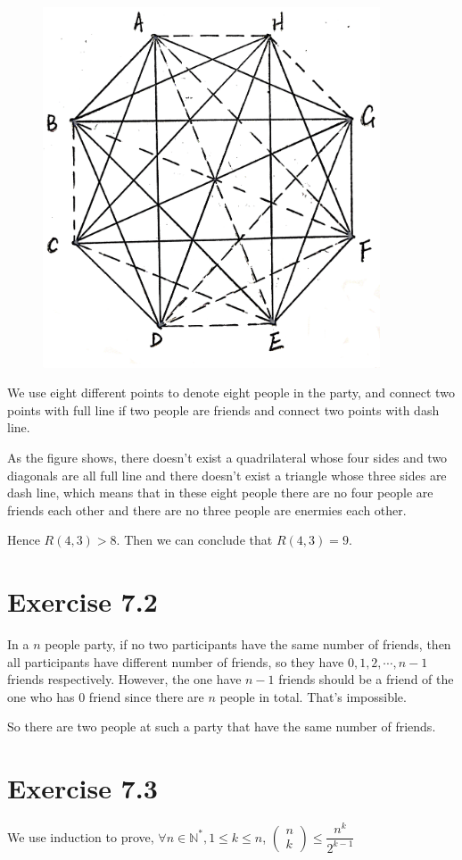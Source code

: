 \documentclass[a4paper,12pt,titlepage]{article}
\begin{document}
\begin{figure}[H]
	\centering
	\includegraphics[width=10cm]{2.jpg}
\end{figure}

We use eight different points to denote eight people in the party, and connect two points with full line if two people are friends and connect two points with dash line.
 
As the figure shows, there doesn't exist a quadrilateral whose four sides and two diagonals are all full line and there doesn't exist a triangle whose three sides are dash line, which means that in these eight people there are no four people are friends each other and there are no three people are enermies each other. 

Hence $R(4,3)>8$. Then we can conclude that $R(4,3)=9$.

\section*{Exercise 7.2}
In a $n$ people party, if no two participants have the same number of friends, then all participants have different number of friends, so they have $0,1,2,\cdots,n-1$ friends respectively. However, the one have $n-1$ friends should be a friend of the one who has $0$ friend since there are $n$ people in total. That's impossible.

So there are two people at such a party that have the same number of friends.

\section*{Exercise 7.3}
We use induction to prove, $\forall n\in\mathbb{N}^*,1\leqslant k\leqslant n$, $\begin{pmatrix}
n\\
k
\end{pmatrix}\leqslant\dfrac{n^k}{2^{k-1}}$
\end{document}
